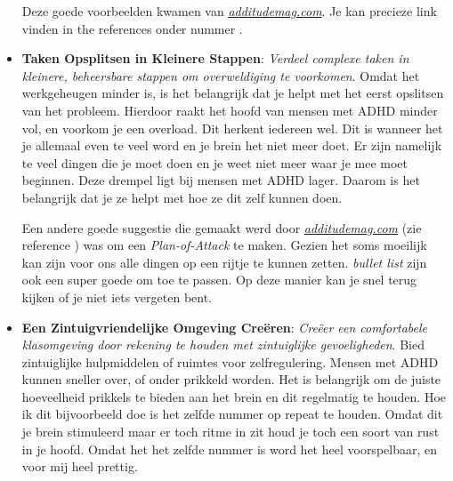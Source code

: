 \begin{itemize}
                        Deze goede voorbeelden kwamen van \emph{\hyperlink{https://www.additudemag.com/visual-learner-homework-help/}{additudemag.com}}. Je kan precieze link vinden in the references onder nummer \cite{ADHD-visual}.
                    
                    \item \textbf{Taken Opsplitsen in Kleinere Stappen}: 
                        \textit{Verdeel complexe taken in kleinere, beheersbare stappen om overweldiging te voorkomen}. Omdat het werkgeheugen minder is, is het belangrijk dat je helpt met het eerst opslitsen van het probleem. Hierdoor raakt het hoofd van mensen met ADHD minder vol, en voorkom je een overload. Dit herkent iedereen wel. Dit is wanneer het je allemaal even te veel word en je brein het niet meer doet. Er zijn namelijk te veel dingen die je moet doen en je weet niet meer waar je mee moet beginnen. Deze drempel ligt bij mensen met ADHD lager. Daarom is het belangrijk dat je ze helpt met hoe ze dit zelf kunnen doen.
    
                        \smallskip
    
                        Een andere goede suggestie die gemaakt werd door \emph{\hyperlink{https://www.additudemag.com/visual-learner-homework-help/}{additudemag.com}} (zie reference \cite{ADHD-visual}) was om een \textit{Plan-of-Attack} te maken. Gezien het soms moeilijk kan zijn voor ons alle dingen op een rijtje te kunnen zetten. \textit{bullet list} zijn ook een super goede om toe te passen. Op deze manier kan je snel terug kijken of je niet iets vergeten bent.

                    \item \textbf{Een Zintuigvriendelijke Omgeving Creëren}: 
                        \textit{Creëer een comfortabele klasomgeving door rekening te houden met zintuiglijke gevoeligheden}. Bied zintuiglijke hulpmiddelen of ruimtes voor zelfregulering. Mensen met ADHD kunnen sneller over, of onder prikkeld worden. Het is belangrijk om de juiste hoeveelheid prikkels te bieden aan het brein en dit regelmatig te houden. Hoe ik dit bijvoorbeeld doe is het zelfde nummer op repeat te houden. Omdat dit je brein stimuleerd maar er toch ritme in zit houd je toch een soort van rust in je hoofd. Omdat het het zelfde nummer is word het heel voorspelbaar, en voor mij heel prettig.



\end{itemize}
